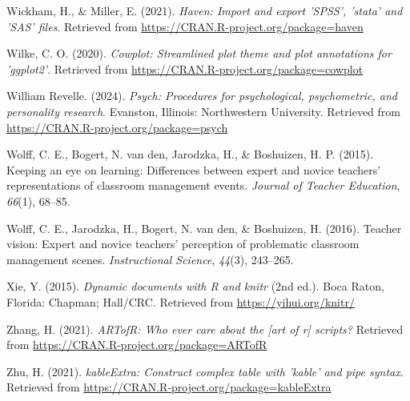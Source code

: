 \documentclass[
  man]{apa6}
\newlength{\cslhangindent}
\newenvironment{CSLReferences}[2] %
 {\begin{list}{}{%
  \setlength{\itemindent}{0pt}
  \setlength{\leftmargin}{0pt}
  \setlength{\parsep}{0pt}
  \ifodd #1
   \setlength{\leftmargin}{\cslhangindent}
   \setlength{\itemindent}{-1\cslhangindent}
  \fi
  \setlength{\itemsep}{#2\baselineskip}}}
 {\end{list}}
\begin{document}
\begin{CSLReferences}{1}{0}
Wickham, H., \& Miller, E. (2021). \emph{Haven: Import and export 'SPSS', 'stata' and 'SAS' files}. Retrieved from \url{https://CRAN.R-project.org/package=haven}

Wilke, C. O. (2020). \emph{Cowplot: Streamlined plot theme and plot annotations for 'ggplot2'}. Retrieved from \url{https://CRAN.R-project.org/package=cowplot}

William Revelle. (2024). \emph{Psych: Procedures for psychological, psychometric, and personality research}. Evanston, Illinois: Northwestern University. Retrieved from \url{https://CRAN.R-project.org/package=psych}

Wolff, C. E., Bogert, N. van den, Jarodzka, H., \& Boshuizen, H. P. (2015). Keeping an eye on learning: Differences between expert and novice teachers' representations of classroom management events. \emph{Journal of Teacher Education}, \emph{66}(1), 68--85.

Wolff, C. E., Jarodzka, H., Bogert, N. van den, \& Boshuizen, H. (2016). Teacher vision: Expert and novice teachers' perception of problematic classroom management scenes. \emph{Instructional Science}, \emph{44}(3), 243--265.

Xie, Y. (2015). \emph{Dynamic documents with {R} and knitr} (2nd ed.). Boca Raton, Florida: Chapman; Hall/CRC. Retrieved from \url{https://yihui.org/knitr/}

Zhang, H. (2021). \emph{ARTofR: Who ever care about the {[}art of r{]} scripts?} Retrieved from \url{https://CRAN.R-project.org/package=ARTofR}

Zhu, H. (2021). \emph{kableExtra: Construct complex table with 'kable' and pipe syntax}. Retrieved from \url{https://CRAN.R-project.org/package=kableExtra}

\end{CSLReferences}

\endgroup


\clearpage
\renewcommand{\listtablename}{Table captions}
\end{document}
